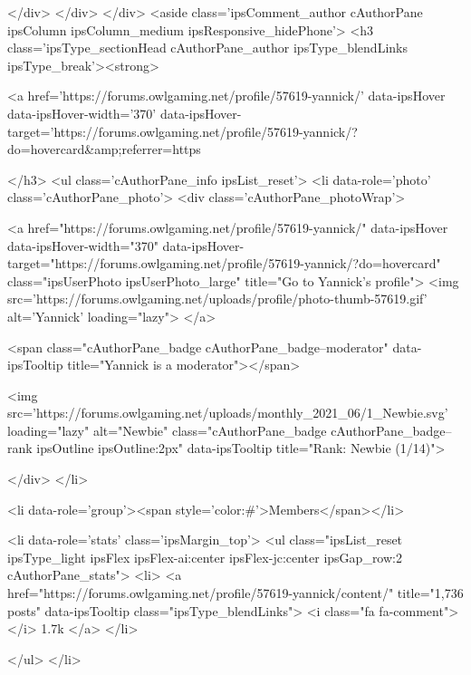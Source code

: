 			</div>
		</div>
	</div>
	<aside class='ipsComment_author cAuthorPane ipsColumn ipsColumn_medium ipsResponsive_hidePhone'>
		<h3 class='ipsType_sectionHead cAuthorPane_author ipsType_blendLinks ipsType_break'><strong>


<a href='https://forums.owlgaming.net/profile/57619-yannick/' data-ipsHover data-ipsHover-width='370' data-ipsHover-target='https://forums.owlgaming.net/profile/57619-yannick/?do=hovercard&amp;referrer=https%
			
		</h3>
		<ul class='cAuthorPane_info ipsList_reset'>
			<li data-role='photo' class='cAuthorPane_photo'>
				<div class='cAuthorPane_photoWrap'>
					


	<a href="https://forums.owlgaming.net/profile/57619-yannick/" data-ipsHover data-ipsHover-width="370" data-ipsHover-target="https://forums.owlgaming.net/profile/57619-yannick/?do=hovercard" class="ipsUserPhoto ipsUserPhoto_large" title="Go to Yannick's profile">
		<img src='https://forums.owlgaming.net/uploads/profile/photo-thumb-57619.gif' alt='Yannick' loading="lazy">
	</a>

					
						<span class="cAuthorPane_badge cAuthorPane_badge--moderator" data-ipsTooltip title="Yannick is a moderator"></span>
					
					
						
<img src='https://forums.owlgaming.net/uploads/monthly_2021_06/1_Newbie.svg' loading="lazy" alt="Newbie" class="cAuthorPane_badge cAuthorPane_badge--rank ipsOutline ipsOutline:2px" data-ipsTooltip title="Rank: Newbie (1/14)">
					
				</div>
			</li>
			
				<li data-role='group'><span style='color:#'>Members</span></li>
				
			
			
				<li data-role='stats' class='ipsMargin_top'>
					<ul class="ipsList_reset ipsType_light ipsFlex ipsFlex-ai:center ipsFlex-jc:center ipsGap_row:2 cAuthorPane_stats">
						<li>
							<a href="https://forums.owlgaming.net/profile/57619-yannick/content/" title="1,736 posts" data-ipsTooltip class="ipsType_blendLinks">
								<i class="fa fa-comment"></i> 1.7k
							</a>
						</li>
						
					</ul>
				</li>
			
			
				

